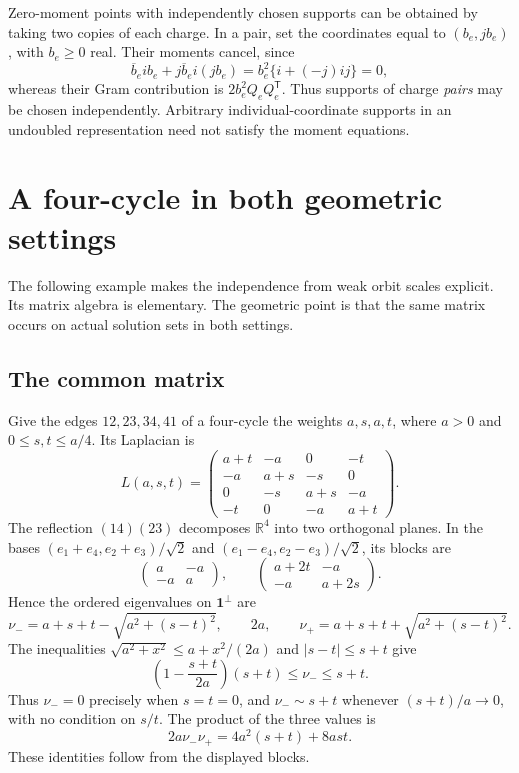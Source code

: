 \documentclass[11pt]{amsart}
\theoremstyle{definition}
\theoremstyle{remark}
\newcommand{\R}{\mathbb R}
\begin{document}
Zero-moment points with independently chosen supports can be obtained
by taking two copies of each charge. In a pair, set the coordinates
equal to $(b_e,jb_e)$, with $b_e\geq0$ real. Their moments cancel,
since
\[
 \overline b_e i b_e+\overline{jb_e}i(jb_e)
       =b_e^2\{i+(-j)ij\}=0,
\]
whereas their Gram contribution is $2b_e^2Q_eQ_e^{\mathsf T}$.
Thus supports of charge \emph{pairs} may be chosen independently.
Arbitrary individual-coordinate supports in an undoubled
representation need not satisfy the moment equations.

\section{A four-cycle in both geometric settings}\label{sec:cycle}

The following example makes the independence from weak orbit scales
explicit. Its matrix algebra is elementary. The geometric point is
that the same matrix occurs on actual solution sets in both settings.

\subsection{The common matrix}
Give the edges $12,23,34,41$ of a four-cycle the weights $a,s,a,t$,
where $a>0$ and $0\leq s,t\leq a/4$. Its Laplacian is
\begin{equation}\label{eq:cyclematrix}
 L(a,s,t)=
 \begin{pmatrix}
 a+t&-a&0&-t\\
 -a&a+s&-s&0\\
 0&-s&a+s&-a\\
 -t&0&-a&a+t
 \end{pmatrix}.
\end{equation}
The reflection $(14)(23)$ decomposes $\R^4$ into two orthogonal
planes. In the bases $(e_1+e_4,e_2+e_3)/\sqrt2$ and
$(e_1-e_4,e_2-e_3)/\sqrt2$, its blocks are
\[
 \begin{pmatrix}a&-a\\-a&a\end{pmatrix},\qquad
 \begin{pmatrix}a+2t&-a\\-a&a+2s\end{pmatrix}.
\]
Hence the ordered eigenvalues on $\mathbf1^\perp$ are
\begin{equation}\label{eq:cycleeigen}
 \nu_-=a+s+t-\sqrt{a^2+(s-t)^2},\qquad
 2a,\qquad
 \nu_+=a+s+t+\sqrt{a^2+(s-t)^2}.
\end{equation}
The inequalities $\sqrt{a^2+x^2}\leq a+x^2/(2a)$ and
$|s-t|\leq s+t$ give
\begin{equation}\label{eq:weakscale}
 \left(1-\frac{s+t}{2a}\right)(s+t)
       \leq\nu_-\leq s+t.
\end{equation}
Thus $\nu_-=0$ precisely when $s=t=0$, and
$\nu_-\sim s+t$ whenever $(s+t)/a\to0$, with no condition on
$s/t$. The product of the three values is
\[
 2a\nu_-\nu_+=4a^2(s+t)+8ast.
\]
These identities follow from the displayed blocks.
\end{document}
